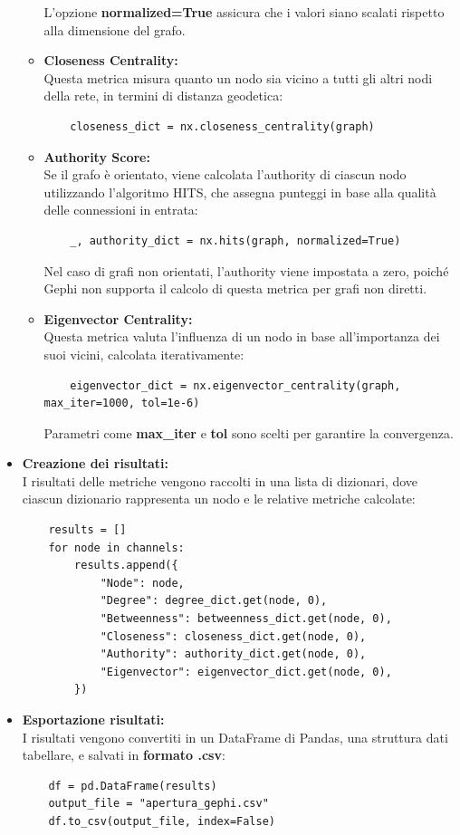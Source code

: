 \documentclass[12pt]{article}
\begin{document}
\begin{itemize}[label=]
\begin{itemize}
\begin{lstlisting}
			\end{lstlisting}
			L'opzione \textbf{normalized=True} assicura che i valori siano scalati rispetto alla dimensione del grafo.
			\item \textbf{Closeness Centrality:}\\
			Questa metrica misura quanto un nodo sia vicino a tutti gli altri nodi della rete, in termini di distanza geodetica:
			\begin{lstlisting}
	closeness_dict = nx.closeness_centrality(graph)
			\end{lstlisting}
			\item \textbf{Authority Score:}\\
			Se il grafo è orientato, viene calcolata l'authority di ciascun nodo utilizzando l'algoritmo HITS, che assegna punteggi in base alla qualità delle connessioni in entrata:
			\begin{lstlisting}
	_, authority_dict = nx.hits(graph, normalized=True)
			\end{lstlisting}
			Nel caso di grafi non orientati, l’authority viene impostata a zero, poiché Gephi non supporta il calcolo di questa metrica per grafi non diretti.
			\item \textbf{Eigenvector Centrality:}\\
			Questa metrica valuta l’influenza di un nodo in base all’importanza dei suoi vicini, calcolata iterativamente:
			\begin{lstlisting}
	eigenvector_dict = nx.eigenvector_centrality(graph, max_iter=1000, tol=1e-6)
			\end{lstlisting}
			Parametri come \textbf{max\_iter} e \textbf{tol} sono scelti per garantire la convergenza.
		\end{itemize}
		\item \textbf{Creazione dei risultati:}\\
		I risultati delle metriche vengono raccolti in una lista di dizionari, dove ciascun dizionario rappresenta un nodo e le relative metriche calcolate:
		\begin{lstlisting}
	results = []
	for node in channels:
		results.append({
			"Node": node,
			"Degree": degree_dict.get(node, 0),
			"Betweenness": betweenness_dict.get(node, 0),
			"Closeness": closeness_dict.get(node, 0),
			"Authority": authority_dict.get(node, 0),
			"Eigenvector": eigenvector_dict.get(node, 0),
		})
		\end{lstlisting}
		\item \textbf{Esportazione risultati:}\\
		I risultati vengono convertiti in un DataFrame di Pandas, una struttura dati tabellare, e salvati in \textbf{formato .csv}:
		\begin{lstlisting}
	df = pd.DataFrame(results)
	output_file = "apertura_gephi.csv"
	df.to_csv(output_file, index=False)
		\end{lstlisting}
	\end{itemize}
\end{document}
